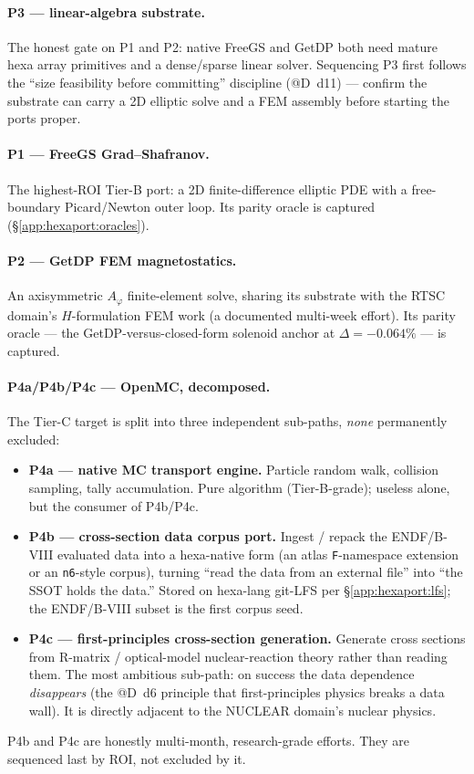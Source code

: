\paragraph{P3 --- linear-algebra substrate.} The honest gate on P1 and
P2: native FreeGS and GetDP both need mature hexa array primitives and
a dense/sparse linear solver. Sequencing P3 first follows the
``size feasibility before committing'' discipline (@D~d11) --- confirm
the substrate can carry a 2D elliptic solve and a FEM assembly before
starting the ports proper.

\paragraph{P1 --- FreeGS Grad--Shafranov.} The highest-ROI Tier-B port:
a 2D finite-difference elliptic PDE with a free-boundary Picard/Newton
outer loop. Its parity oracle is captured (\S\ref{app:hexaport:oracles}).

\paragraph{P2 --- GetDP FEM magnetostatics.} An axisymmetric
$A_\varphi$ finite-element solve, sharing its substrate with the RTSC
domain's $H$-formulation FEM work (a documented multi-week effort). Its
parity oracle --- the GetDP-versus-closed-form solenoid anchor at
$\Delta=-0.064\%$ --- is captured.

\paragraph{P4a/P4b/P4c --- OpenMC, decomposed.} The Tier-C target is
split into three independent sub-paths, \emph{none} permanently
excluded:
\begin{itemize}\itemsep0.2em
\item \textbf{P4a --- native MC transport engine.} Particle random
walk, collision sampling, tally accumulation. Pure algorithm
(Tier-B-grade); useless alone, but the consumer of P4b/P4c.
\item \textbf{P4b --- cross-section data corpus port.} Ingest /
repack the ENDF/B-VIII evaluated data into a hexa-native form (an
atlas \texttt{F}-namespace extension or an \texttt{n6}-style corpus),
turning ``read the data from an external file'' into ``the SSOT holds
the data.'' Stored on hexa-lang git-LFS per \S\ref{app:hexaport:lfs};
the ENDF/B-VIII subset is the first corpus seed.
\item \textbf{P4c --- first-principles cross-section generation.}
Generate cross sections from R-matrix / optical-model nuclear-reaction
theory rather than reading them. The most ambitious sub-path: on
success the data dependence \emph{disappears} (the @D~d6 principle that
first-principles physics breaks a data wall). It is directly adjacent to
the NUCLEAR domain's nuclear physics.
\end{itemize}
P4b and P4c are honestly multi-month, research-grade efforts. They are
sequenced last by ROI, not excluded by it.

